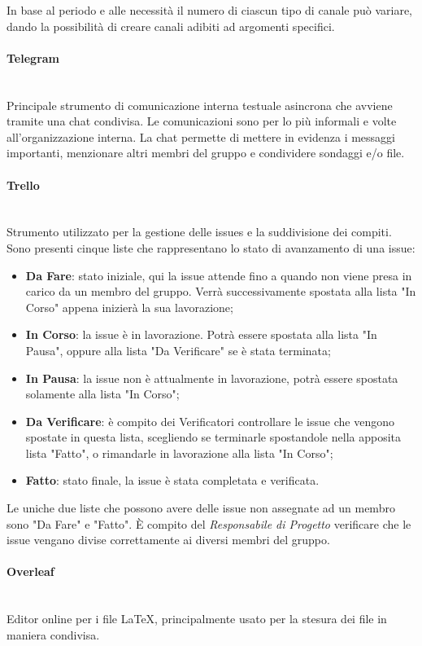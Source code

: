 \documentclass{article}
\begin{document}
In base al periodo e alle necessità il numero di ciascun tipo di canale può variare, dando la possibilità di creare canali adibiti ad argomenti specifici.

\paragraph{Telegram}~\\
Principale strumento di comunicazione interna testuale asincrona che avviene tramite una chat condivisa. Le comunicazioni sono per lo più informali e volte all'organizzazione interna. La chat permette di mettere in evidenza i messaggi importanti, menzionare altri membri del gruppo e condividere sondaggi e/o file.

\paragraph{Trello}~\\
Strumento utilizzato per la gestione delle issues e la suddivisione dei compiti. Sono presenti cinque liste che rappresentano lo stato di avanzamento di una issue:
\begin{itemize} 
    \item\textbf{Da Fare}: stato iniziale, qui la issue attende fino a quando non viene presa in carico da un membro del gruppo. Verrà successivamente spostata alla lista "In Corso" appena inizierà la sua lavorazione;
    \item\textbf{In Corso}: la issue è in lavorazione. Potrà essere spostata alla lista "In Pausa", oppure alla lista "Da Verificare" se è stata terminata;
    \item\textbf{In Pausa}: la issue non è attualmente in lavorazione, potrà essere spostata solamente alla lista "In Corso";
    \item\textbf{Da Verificare}: è compito dei Verificatori controllare le issue che vengono spostate in questa lista, scegliendo se terminarle spostandole nella apposita lista "Fatto", o rimandarle in lavorazione alla lista "In Corso";
    \item\textbf{Fatto}: stato finale, la issue è stata completata e verificata.
\end{itemize}
Le uniche due liste che possono avere delle issue non assegnate ad un membro sono "Da Fare" e "Fatto".
È compito del \textit{Responsabile di Progetto} verificare che le issue vengano divise correttamente ai diversi membri del gruppo. 
\paragraph{Overleaf}~\\
Editor online per i file LaTeX, principalmente usato per la stesura dei file in maniera condivisa.
\end{document}

